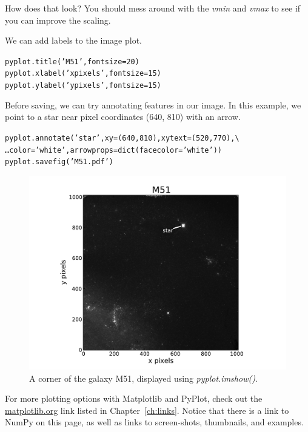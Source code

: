 How does that look? You should mess around with the \textit{vmin} and \textit{vmax} to see if you can improve the scaling.

We can add labels to the image plot.  

\begin{alltt}
\pytab pyplot.title('M51', fontsize=20)
\pytab pyplot.xlabel('x pixels', fontsize=15)
\pytab pyplot.ylabel('y pixels', fontsize=15)
\end{alltt}

Before saving, we can try annotating features in our image. In this example,
we point to a star near pixel coordinates (640, 810) with an arrow.

\begin{alltt}
\pytab pyplot.annotate('star', xy=(640,810),  xytext=(520,770), \textbackslash
\ldots color='white', arrowprops=dict(facecolor='white'))
\pytab pyplot.savefig('M51.pdf')
\end{alltt}

\begin{figure}[tbp]
  \centering
    \includegraphics[scale=0.55]{M51.pdf}
    \caption{A corner of the galaxy M51, displayed using \textit{pyplot.imshow()}.}
  \label{fig:M51}
\end{figure}


For more
plotting options with Matplotlib and PyPlot, check out the 
\href{http://matplotlib.org/}{matplotlib.org} link listed in
Chapter~\ref{ch:links}.  Notice that there is a link to NumPy on this
page, as well as links to screen-shots, thumbnails, and examples.

